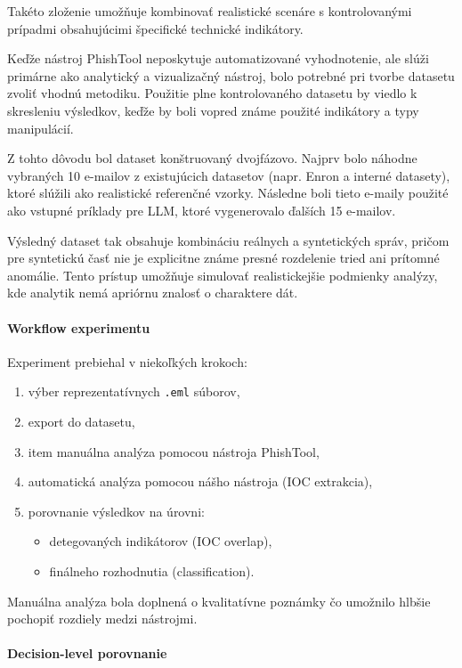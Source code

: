 \documentclass[conference]{IEEEtran}
\begin{document}
Takéto zloženie umožňuje kombinovať realistické scenáre s kontrolovanými
prípadmi obsahujúcimi špecifické technické indikátory.

Keďže nástroj PhishTool neposkytuje automatizované vyhodnotenie, ale slúži
primárne ako analytický a vizualizačný nástroj, bolo potrebné pri tvorbe
datasetu zvoliť vhodnú metodiku. Použitie plne kontrolovaného datasetu by
viedlo k skresleniu výsledkov, keďže by boli vopred známe použité indikátory
a typy manipulácií.

Z tohto dôvodu bol dataset konštruovaný dvojfázovo. Najprv bolo náhodne
vybraných 10 e-mailov z existujúcich datasetov (napr. Enron a interné datasety),
ktoré slúžili ako realistické referenčné vzorky. Následne boli tieto e-maily
použité ako vstupné príklady pre LLM, ktoré vygenerovalo ďalších 15 e-mailov.

Výsledný dataset tak obsahuje kombináciu reálnych a syntetických správ,
pričom pre syntetickú časť nie je explicitne známe presné rozdelenie tried
ani prítomné anomálie. Tento prístup umožňuje simulovať realistickejšie
podmienky analýzy, kde analytik nemá apriórnu znalosť o charaktere dát.

\paragraph{Workflow experimentu}

Experiment prebiehal v niekoľkých krokoch:

\begin{enumerate}
    \item výber reprezentatívnych \texttt{.eml} súborov,
    \item export do datasetu,
    \item item manuálna analýza pomocou nástroja PhishTool,
    \item automatická analýza pomocou nášho nástroja (IOC extrakcia),
    \item porovnanie výsledkov na úrovni:
    \begin{itemize}
        \item detegovaných indikátorov (IOC overlap),
        \item finálneho rozhodnutia (classification).
    \end{itemize}
\end{enumerate}

Manuálna analýza bola doplnená o kvalitatívne poznámky
čo umožnilo hlbšie pochopiť rozdiely medzi nástrojmi.

\paragraph{Decision-level porovnanie}
\end{document}
